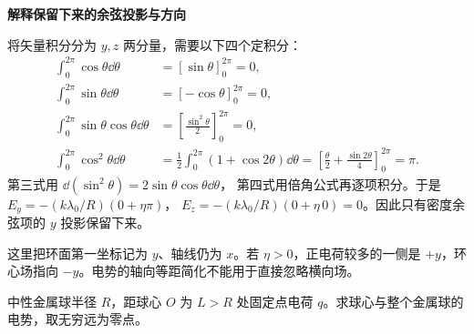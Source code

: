 \begin{solution}
\par\medskip{}\noindent\textbf{解释保留下来的余弦投影与方向}\par\nobreak
将矢量积分分为 $y,z$ 两分量，需要以下四个定积分：
\begin{align*}
 \int_0^{2\pi}\cos\theta\dd\theta
 &=[\sin\theta]_0^{2\pi}=0,\\
 \int_0^{2\pi}\sin\theta\dd\theta
 &=[-\cos\theta]_0^{2\pi}=0,\\
 \int_0^{2\pi}\sin\theta\cos\theta\dd\theta
 &=\left[\frac{\sin^2\theta}{2}\right]_0^{2\pi}=0,\\
 \int_0^{2\pi}\cos^2\theta\dd\theta
 &=\frac12\int_0^{2\pi}(1+\cos2\theta)\dd\theta
 =\left[\frac\theta2+\frac{\sin2\theta}{4}\right]_0^{2\pi}=\pi.
\end{align*}
第三式用 $\dd(\sin^2\theta)=2\sin\theta\cos\theta\dd\theta$，
第四式用倍角公式再逐项积分。于是
$E_y=-(k\lambda_0/R)(0+\eta\pi)$，
$E_z=-(k\lambda_0/R)(0+\eta\,0)=0$。因此只有密度余弦项的 $y$ 投影保留下来。



这里把环面第一坐标记为 $y$、轴线仍为 $x$。若 $\eta>0$，正电荷较多的一侧是 $+y$，环心场指向 $-y$。电势的轴向等距简化不能用于直接忽略横向场。\end{solution}
\begin{question}\begin{example}[外点电荷旁中性金属球的电势]\label{e2:example:5}
中性金属球半径 $R$，距球心 $O$ 为 $L>R$ 处固定点电荷 $q$。求球心与整个金属球的电势，取无穷远为零点。
\end{example}
\end{question}

